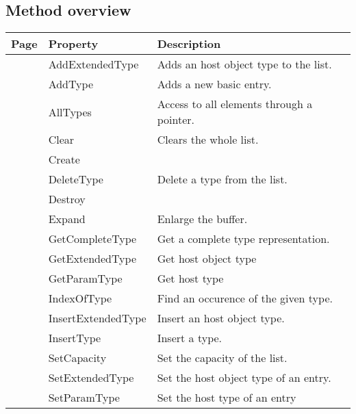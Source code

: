\subsection{Method overview}
\label{thoriumcorepkg:thorium:tthoriumhostfunctionparameterspec:methods}
\begin{tabularx}{\textwidth}{llX}
Page & Property & Description  \\ \hline
\pageref{thoriumcorepkg:thorium:tthoriumhostfunctionparameterspec:addextendedtype} & AddExtendedType  & Adds an host object type to the list. \\
\pageref{thoriumcorepkg:thorium:tthoriumhostfunctionparameterspec:addtype} & AddType  & Adds a new basic entry. \\
\pageref{thoriumcorepkg:thorium:tthoriumhostfunctionparameterspec:alltypes} & AllTypes  & Access to all elements through a pointer. \\
\pageref{thoriumcorepkg:thorium:tthoriumhostfunctionparameterspec:clear} & Clear  & Clears the whole list. \\
\pageref{thoriumcorepkg:thorium:tthoriumhostfunctionparameterspec:create} & Create  &  \\
\pageref{thoriumcorepkg:thorium:tthoriumhostfunctionparameterspec:deletetype} & DeleteType  & Delete a type from the list. \\
\pageref{thoriumcorepkg:thorium:tthoriumhostfunctionparameterspec:destroy} & Destroy  &  \\
\pageref{thoriumcorepkg:thorium:tthoriumhostfunctionparameterspec:expand} & Expand  & Enlarge the buffer. \\
\pageref{thoriumcorepkg:thorium:tthoriumhostfunctionparameterspec:getcompletetype} & GetCompleteType  & Get a complete type representation. \\
\pageref{thoriumcorepkg:thorium:tthoriumhostfunctionparameterspec:getextendedtype} & GetExtendedType  & Get host object type \\
\pageref{thoriumcorepkg:thorium:tthoriumhostfunctionparameterspec:getparamtype} & GetParamType  & Get host type \\
\pageref{thoriumcorepkg:thorium:tthoriumhostfunctionparameterspec:indexoftype} & IndexOfType  & Find an occurence of the given type. \\
\pageref{thoriumcorepkg:thorium:tthoriumhostfunctionparameterspec:insertextendedtype} & InsertExtendedType  & Insert an host object type. \\
\pageref{thoriumcorepkg:thorium:tthoriumhostfunctionparameterspec:inserttype} & InsertType  & Insert a type. \\
\pageref{thoriumcorepkg:thorium:tthoriumhostfunctionparameterspec:setcapacity} & SetCapacity  & Set the capacity of the list. \\
\pageref{thoriumcorepkg:thorium:tthoriumhostfunctionparameterspec:setextendedtype} & SetExtendedType  & Set the host object type of an entry. \\
\pageref{thoriumcorepkg:thorium:tthoriumhostfunctionparameterspec:setparamtype} & SetParamType  & Set the host type of an entry \\
\hline
\end{tabularx}
